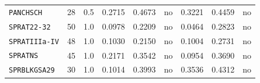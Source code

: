 \begin{landscape}
\begin{longtable}{@{}p{2.9cm}r r r r c r r c@{}}
\texttt{PANCHSCH} & 28 & 0.5 & 0.2715 & 0.4673 & no & 0.3221 & 0.4459 & no \\
\texttt{SPRAT22-32} & 50 & 1.0 & 0.0978 & 0.2209 & no & 0.0464 & 0.2823 & no \\
\texttt{SPRATIIIa-IV} & 48 & 1.0 & 0.1030 & 0.2150 & no & 0.1004 & 0.2731 & no \\
\texttt{SPRATNS} & 45 & 1.0 & 0.2171 & 0.3542 & no & 0.0954 & 0.3690 & no \\
\texttt{SPRBLKGSA29} & 30 & 1.0 & 0.1014 & 0.3993 & no & 0.3536 & 0.4312 & no \\
\end{longtable}
\end{landscape}
